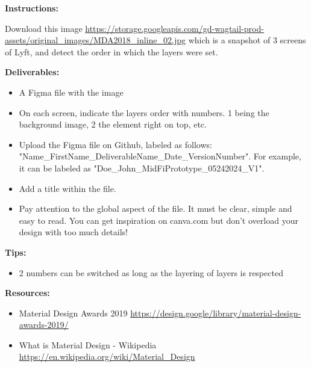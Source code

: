 \makeheaderfiles

\textbf{Instructions:}

Download this image \url{https://storage.googleapis.com/gd-wagtail-prod-assets/original_images/MDA2018_inline_02.jpg} which is a snapshot of 3 screens of Lyft, and detect the order in which the layers were set.

\textbf{Deliverables:}

\begin{itemize}
\item A Figma file with the image
\item On each screen, indicate the layers order with numbers. 1 being the background image, 2 the element right on top, etc.
\item Upload the Figma file on Github, labeled as follows: "Name\_FirstName\_DeliverableName\_Date\_VersionNumber". For example, it can be labeled as "Doe\_John\_MidFiPrototype\_05242024\_V1".
\item Add a title within the file.
\item Pay attention to the global aspect of the file. It must be clear, simple and easy to read. You can get inspiration on canva.com but don't overload your design with too much details!
\end{itemize}

\textbf{Tips:}

\begin{itemize}
\item 2 numbers can be switched as long as the layering of layers is respected 
\end{itemize}

\textbf{Resources:}

\begin{itemize}
\item Material Design Awards 2019 \url{https://design.google/library/material-design-awards-2019/}
\item What is Material Design - Wikipedia \url{https://en.wikipedia.org/wiki/Material_Design}
\end{itemize}

